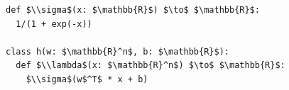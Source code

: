 \documentclass[border=10pt]{standalone}
\begin{document}
\begin{lstlisting}
def $\\sigma$(x: $\mathbb{R}$) $\to$ $\mathbb{R}$:
  1/(1 + exp(-x))

class h(w: $\mathbb{R}^n$, b: $\mathbb{R}$):
  def $\\lambda$(x: $\mathbb{R}^n$) $\to$ $\mathbb{R}$:
    $\\sigma$(w$^T$ * x + b)
\end{lstlisting}
\end{document}
